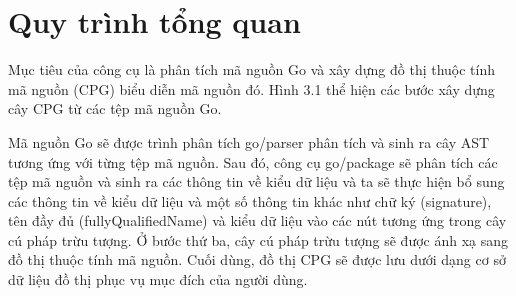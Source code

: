 \section{Quy trình tổng quan}

Mục tiêu của công cụ là phân tích mã nguồn Go và xây dựng đồ thị thuộc tính mã
nguồn (CPG) biểu diễn mã nguồn đó. Hình 3.1 thể hiện các bước xây dựng cây CPG từ
các tệp mã nguồn Go.

Mã nguồn Go sẽ được trình phân tích go/parser phân tích và sinh ra cây AST tương
ứng với từng tệp mã nguồn. Sau đó, công cụ go/package sẽ phân tích các tệp mã nguồn
và sinh ra các thông tin về kiểu dữ liệu và ta sẽ thực hiện bổ sung các thông tin về kiểu dữ
liệu và một số thông tin khác như chữ ký (signature), tên đầy đủ (fullyQualifiedName) và kiểu dữ liệu vào các nút tương ứng trong cây cú pháp trừu tượng. Ở bước thứ ba, cây
cú pháp trừu tượng sẽ được ánh xạ sang đồ thị thuộc tính mã nguồn. Cuối dùng, đồ thị
CPG sẽ được lưu dưới dạng cơ sở dữ liệu đồ thị phục vụ mục đích của người dùng.